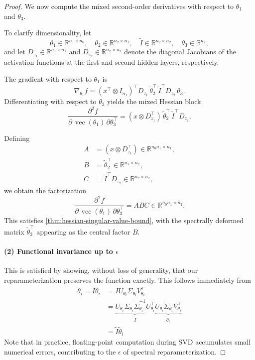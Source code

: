 \documentclass{article}
\theoremstyle{plain}
\theoremstyle{definition}
\theoremstyle{remark}
\begin{document}
\begin{proof}
We now compute the mixed second-order derivatives with respect to $\theta_1$ and $\theta_3$.

To clarify dimensionality, let
\[
\theta_1 \in \mathbb{R}^{n_1 \times n_0}, \quad
\theta_2 \in \mathbb{R}^{n_2 \times n_1}, \quad
\tilde{I} \in \mathbb{R}^{n_2 \times n_2}, \quad
\theta_3 \in \mathbb{R}^{n_2},
\]
and let $D_{z_1} \in \mathbb{R}^{n_1 \times n_1}$ and
$D_{z_2} \in \mathbb{R}^{n_2 \times n_2}$ denote the diagonal Jacobians of the activation functions at the first and second hidden layers, respectively.

The gradient with respect to $\theta_1$ is
\[
\nabla_{\theta_1} f
= (x^{\top} \otimes I_{n_1})^{\top}
D_{z_1}\,\tilde{\theta}_2^{\top}\,\tilde{I}^{\top} D_{z_2}\,\theta_3 .
\]
Differentiating with respect to $\theta_3$ yields the mixed Hessian block
\[
\frac{\partial^2 f}{\partial\,\operatorname{vec}(\theta_1)\,\partial \theta_3^{\top}}
=
(x \otimes D_{z_1}^{\top})\,
\tilde{\theta}_2^{\top}\,\tilde{I}^{\top} D_{z_2}.
\]

Defining
\begin{align*}
A &= (x \otimes D_{z_1}^{\top}) \in \mathbb{R}^{n_0 n_1 \times n_1}, \\
B &= \tilde{\theta}_2^{\top} \in \mathbb{R}^{n_1 \times n_2}, \\
C &= \tilde{I}^{\top} D_{z_2} \in \mathbb{R}^{n_2 \times n_2},
\end{align*}
we obtain the factorization
\[
\frac{\partial^2 f}{\partial\,\operatorname{vec}(\theta_1)\,\partial \theta_3^{\top}}
= ABC \in \mathbb{R}^{n_0 n_1 \times n_2}.
\]
This satisfies \cref{thm:hessian-singular-value-bound}, with the spectrally deformed matrix
$\tilde{\theta}_2^{\top}$ appearing as the central factor $B$.

\paragraph{(2) Functional invariance up to $\epsilon$} This is satisfied by showing, without loss of generality, that our reparameterization preserves the function exactly. This follows immediately from
\begin{align*}
\theta_i = I\theta_i &= I U_{\theta_i}\Sigma_{\theta_i}V_{\theta_i}^{\top} \\
&= \underbrace{U_{\theta_i}\Sigma_{\theta_i}\tilde{\Sigma}_{\theta_i}^{-1}U_{\theta_i}^{\top}}_{\tilde{I}}\underbrace{U_{\theta_i}\tilde{\Sigma}_{\theta_i}V_{\theta_i}^{\top}}_{\tilde{\theta}_i} \\
&= \tilde{I}\tilde{\theta}_i
\end{align*}
Note that in practice, floating-point computation during SVD accumulates small numerical errors, contributing to the $\epsilon$ of spectral reparameterization.
\end{proof}
\end{document}
